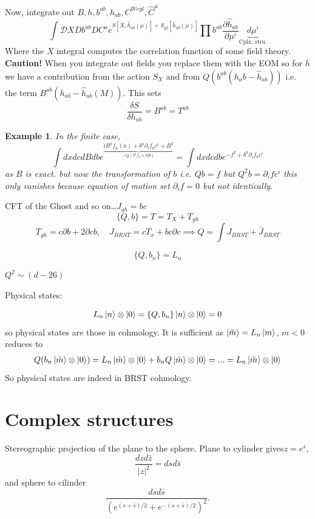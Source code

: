 \documentclass[10pt,
 article,
 amsmath,amssymb
]{revtex4-2}
\newtheorem{example}[theorem]{Example}
\begin{document}
Now, integrate out $B,h,b^{ab},h_{ab},C^{Weyl},\hat{C}^\mu$ 
\begin{equation}
    \int \mathcal{D}X D b^{ab} D C^a e^{S[X,\hat{h}_{ab}(\mu)]+S_{gf}[\hat{h}_{ab}(\mu)]} \prod b^{ab} \frac{\partial \hat{h}_{ab}}{\partial \mu^i} \underbrace{d\mu^i}_{\text{Cplx. stru.}}
\end{equation}
Where the $X$ integral computes the correlation function of some field theory. {\bf Caution!} When you integrate out fields 
you replace them with the EOM so for $h$ we have a contribution from the action $S_X$ and from $Q(b^{ab}(h_ab-\hat{h}_{ab}))$ i.e. 
the term $B^{ab}(h_{ab}-\hat{h}_{ab}(M))$. This sets $$\frac{\delta S}{\delta h_{ab}}= B^{ab}=T^{ab}$$

\begin{example}
    In the finite case,
    $$\int dxdc dB db e^{\underbrace{iB^a f_a (x)+ b^a \partial_i f_a c^i +B^2}_{-Q(b^a f_a +b B)}}= \int dx dc db e^{-f^2 +b^a \partial_i f_a c^i}$$
    as $B$ is exact. but now the transformation of $b$ i.e. $Qb=f$  but $Q^2 b= \partial_i f c^i$ this only vanishes because equation of motion 
    set $\partial_i f=0$ but not identically.
\end{example}

CFT of the Ghost and so on\dots $J_{gh}=bc$ 
$$\{Q,b\}=T =T_X+T_{gh}$$
$$T_{gh}=c \partial b +2 \partial c b, \quad J_{BRST}=cT_x +bc \partial c \implies Q=\int J_{BRST}+ \bar{J}_{BRST}$$

$$\{Q,b_n\}=L_n$$

$Q^2 \sim (d-26)$

Physical states:

$$L_n \ket{n} \otimes \ket{0}=\{Q,b_n\}\ket{n} \otimes \ket{0} = 0 $$
so physical states are those in cohmology. It is sufficient as $\ket{\tilde{m}}=L_n \ket{m}$, $m<0$ reduces to 
\begin{align}
    Q (b_n \ket{\tilde{m}} \otimes \ket{0})= L_n \ket{\tilde{m}} \otimes \ket{0}+ b_n Q \ket{\tilde{m}} \otimes \ket{0}=...= L_n \ket{\tilde{m}} \otimes \ket{0}
\end{align}
So physical states are indeed in BRST cohmology.


\section{Complex structures}
Stereographic projection of the plane to the sphere. Plane to cylinder gives$z=e^s$,
$$\frac{dz d\bar{z}}{|z|^2}=ds d\bar{s}$$
and sphere to cilinder $$\frac{ds d\bar{s}}{(e^{(s+\bar{s})/2}+e^{-(s+\bar{s})/2})^2}.$$
\end{document}
